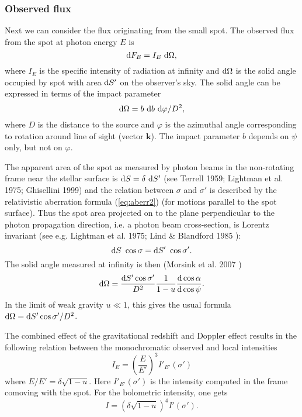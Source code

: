 \documentclass{wihuri}
\def\be{\begin{equation}}
\def\ee{\end{equation}}
\def\d{{\rm d}}
\def\Dop{\delta}
\newcommand{\bmath}[1]{\boldsymbol{#1}}
\begin{document}
\subsubsection{Observed flux}

Next we can consider the flux originating from the small spot. The observed flux from the spot at photon energy $E$ is
\be
\label{eq:dF_E2}
  \d F_E=I_E\ \d\Omega,
\ee
where $I_E$ is the specific   intensity of radiation
at infinity and $\d\Omega$ is
the solid angle occupied by spot with area $\d S'$ on the observer's sky.
The solid angle can be expressed in terms of the impact parameter
\be
\d\Omega=b\ \d b\ \d\varphi/D^2,
\ee
where $D$ is the distance to the source and $\varphi$ is the azimuthal
angle corresponding to rotation around line of sight (vector $\bmath{k}$).
The impact parameter $b$ depends on $\psi$ only, but not on $\varphi$.

The apparent area of the spot as measured by photon beams
in the non-rotating frame near the stellar surface is $\d S=\Dop\ \d S'$
(see Terrell 1959; Lightman et al. 1975; Ghisellini 1999) 
and the relation between $\sigma$ and $\sigma'$ is described 
by the relativistic aberration formula (\ref{eq:aberr2}) (for motions parallel to the 
spot surface). Thus the spot area projected on to the plane perpendicular 
to the photon propagation direction, i.e. a photon beam cross-section,
is Lorentz invariant (see e.g.  Lightman et al. 1975; %
Lind \& Blandford 1985 \cite{lindbland85}): 
\be \label{eq:Salpha2}
\d S\ \cos\sigma = \d S'\ \cos\sigma' . 
\ee
The solid angle measured at infinity is then (Morsink et al. 2007 \cite{morsink})
\be\label{eq:omega2}
 \d\Omega=\frac{\d S' \cos \sigma'}{D^2} \frac{1}{1-u} \frac{\d\cos\alpha}{\d\cos\psi}.
\ee
In the limit of weak gravity $u\ll 1$, this gives
the usual formula $\d\Omega=\d S' \cos \sigma'/D^2$. 

The combined effect of the gravitational redshift and Doppler effect
results in the following  relation between the monochromatic
observed and local intensities \cite{mtw}%
\be
I_{E} = \left (\frac{E}{E'}\right )^3 I'_{E '} (\sigma')
\ee
where $E/E'=\Dop \sqrt{1-u}$.
Here $I'_{E'}(\sigma')$ is the intensity computed in the frame comoving with
the spot.
For the bolometric intensity, one gets
\be
I= \left (\Dop \sqrt{1-u} \right )^4 I'(\sigma') .
\ee
\end{document}
